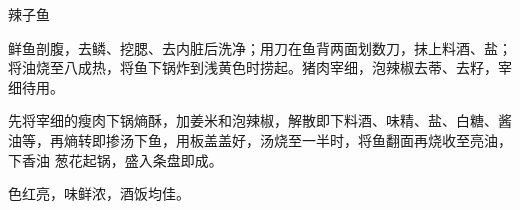 \begin{recipe}{辣子鱼}

\ingredients


\preparation

\step 鲜鱼剖腹，去鳞、挖腮、去内脏后洗净；用刀在鱼背两面划数刀，抹上料酒、盐；
将油烧至八成热，将鱼下锅炸到浅黄色时捞起。猪肉宰细，泡辣椒去蒂、去籽，宰细待用。

\step 先将宰细的瘦肉下锅熵酥，加姜米和泡辣椒，解散即下料酒、味精、盐、白糖、酱
油等，再熵转即掺汤下鱼，用板盖盖好，汤烧至一半时，将鱼翻面再烧收至亮油，下香油
葱花起锅，盛入条盘即成。

\features

色红亮，味鲜浓，酒饭均佳。

\end{recipe}

